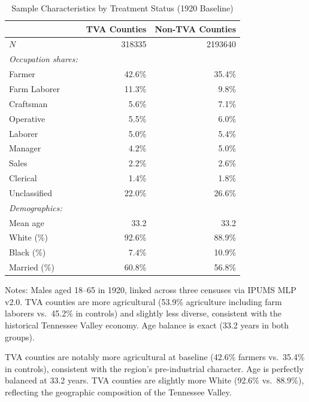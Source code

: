 \documentclass[12pt]{article}
\begin{document}
\begin{table}[H]
\centering
\caption{Sample Characteristics by Treatment Status (1920 Baseline)}
\label{tab:sample}
\begin{threeparttable}
\begin{tabular}{lrr}
\toprule
& TVA Counties & Non-TVA Counties \\
\midrule
$N$ & \num{318335} & \num{2193640} \\
\addlinespace
\textit{Occupation shares:} & & \\
\quad Farmer & 42.6\% & 35.4\% \\
\quad Farm Laborer & 11.3\% & 9.8\% \\
\quad Craftsman & 5.6\% & 7.1\% \\
\quad Operative & 5.5\% & 6.0\% \\
\quad Laborer & 5.0\% & 5.4\% \\
\quad Manager & 4.2\% & 5.0\% \\
\quad Sales & 2.2\% & 2.6\% \\
\quad Clerical & 1.4\% & 1.8\% \\
\quad Unclassified & 22.0\% & 26.6\% \\
\addlinespace
\textit{Demographics:} & & \\
\quad Mean age & 33.2 & 33.2 \\
\quad White (\%) & 92.6\% & 88.9\% \\
\quad Black (\%) & 7.4\% & 10.9\% \\
\quad Married (\%) & 60.8\% & 56.8\% \\
\bottomrule
\end{tabular}
\begin{tablenotes}[flushleft]
\small
\item Notes: Males aged 18--65 in 1920, linked across three censuses via IPUMS MLP v2.0. TVA counties are more agricultural (53.9\% agriculture including farm laborers vs.\ 45.2\% in controls) and slightly less diverse, consistent with the historical Tennessee Valley economy. Age balance is exact (33.2 years in both groups).
\end{tablenotes}
\end{threeparttable}
\end{table}

TVA counties are notably more agricultural at baseline (42.6\% farmers vs.\ 35.4\% in controls), consistent with the region's pre-industrial character. Age is perfectly balanced at 33.2 years. TVA counties are slightly more White (92.6\% vs.\ 88.9\%), reflecting the geographic composition of the Tennessee Valley.
\end{document}
